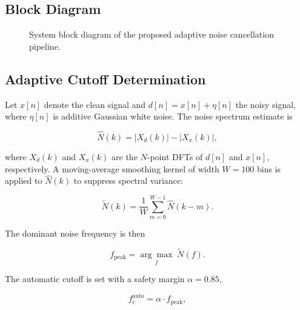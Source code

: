 \documentclass[conference]{IEEEtran}
\begin{document}
\subsection{Block Diagram}

\begin{figure}[htbp]
\centering
\caption{System block diagram of the proposed adaptive noise cancellation
pipeline.}
\label{fig:block}
\end{figure}

\subsection{Adaptive Cutoff Determination}

Let $x[n]$ denote the clean signal and $d[n] = x[n] + \eta[n]$ the noisy
signal, where $\eta[n]$ is additive Gaussian white noise. The noise spectrum
estimate is

\begin{equation}
  \hat{N}(k) = \bigl|X_d(k)\bigr| - \bigl|X_x(k)\bigr|,
  \label{eq:noise_spectrum}
\end{equation}

where $X_d(k)$ and $X_x(k)$ are the $N$-point DFTs of $d[n]$ and $x[n]$,
respectively. A moving-average smoothing kernel of width $W = 100$ bins is
applied to $\hat{N}(k)$ to suppress spectral variance:

\begin{equation}
  \tilde{N}(k) = \frac{1}{W}\sum_{m=0}^{W-1}\hat{N}(k-m).
  \label{eq:smooth}
\end{equation}

The dominant noise frequency is then

\begin{equation}
  f_{\text{peak}} = \underset{f}{\arg\max}\;\tilde{N}(f).
  \label{eq:peak}
\end{equation}

The automatic cutoff is set with a safety margin $\alpha = 0.85$,

\begin{equation}
  f_c^{\text{auto}} = \alpha \cdot f_{\text{peak}},
  \label{eq:cutoff}
\end{equation}
\end{document}
